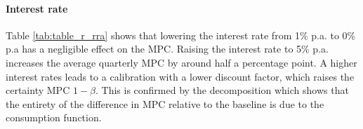 
\paragraph{Interest rate}

\begin{table}[ht]
\label{tab:table_r_rra}

\end{table}

%

Table \ref{tab:table_r_rra} shows that lowering the interest rate from 1\% p.a. to 0\% p.a has a negligible effect on the MPC. Raising the interest rate to 5\% p.a. increases the average quarterly MPC by around half a percentage point. A higher interest rates leads to a calibration with a lower discount factor, which raises the certainty MPC $1-\beta$. This is confirmed by the decomposition which shows that the entirety of the difference in MPC relative to the baseline is due to the consumption function. 


